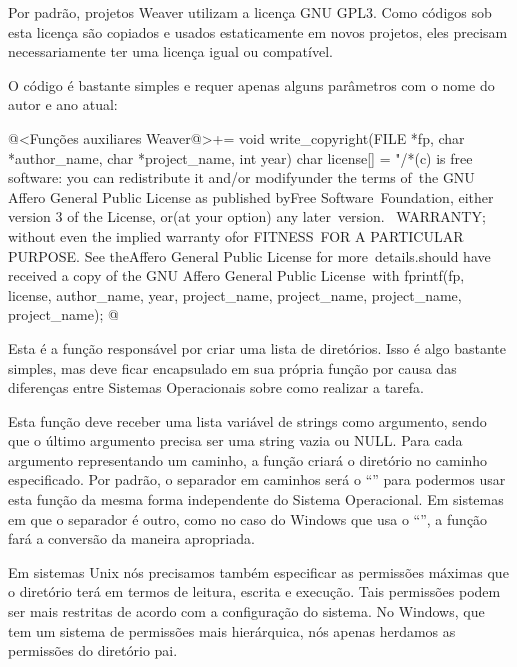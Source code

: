 {

Por padrão, projetos Weaver utilizam a licença GNU GPL3. Como códigos
sob esta licença são copiados e usados estaticamente em novos
projetos, eles precisam necessariamente ter uma licença igual ou
compatível.

O código é bastante simples e requer apenas alguns parâmetros com o
nome do autor e ano atual:

\iniciocodigo
@<Funções auxiliares Weaver@>+=
void write_copyright(FILE *fp, char *author_name, char *project_name, int year){
  char license[] = "/*\nCopyright (c) %
 is free software: you can redistribute it and/or modify\nit under the terms of\
 the GNU Affero General Public License as published by\nthe Free Software\ 
 Foundation, either version 3 of the License, or\n(at your option) any later\
 version.\n\n\
  WARRANTY; without even the implied warranty of\nMERCHANTABILITY or FITNESS\
  FOR A PARTICULAR PURPOSE.  See the\nGNU Affero General Public License for more\
  details.\n\nYou should have received a copy of the GNU Affero General Public License\
\nalong with %
  fprintf(fp, license, author_name, year, project_name, project_name,
          project_name, project_name);
}
@
\fimcodigo

\subsecao{5.8. create\_dir: Cria novos diretórios}

Esta é a função responsável por criar uma lista de diretórios. Isso é
algo bastante simples, mas deve ficar encapsulado em sua própria
função por causa das diferenças entre Sistemas Operacionais sobre como
realizar a tarefa.

Esta função deve receber uma lista variável de strings como argumento,
sendo que o último argumento precisa ser uma string vazia ou
NULL. Para cada argumento representando um caminho, a função criará o
diretório no caminho especificado. Por padrão, o separador em caminhos
será o ``\monoespaco{/}'' para podermos usar esta função da mesma
forma independente do Sistema Operacional. Em sistemas em que o
separador é outro, como no caso do Windows que usa o
``\monoespaco{\\}'', a função fará a conversão da maneira apropriada.

Em sistemas Unix nós precisamos também especificar as permissões
máximas que o diretório terá em termos de leitura, escrita e
execução. Tais permissões podem ser mais restritas de acordo com a
configuração do sistema. No Windows, que tem um sistema de permissões
mais hierárquica, nós apenas herdamos as permissões do diretório pai.

}

